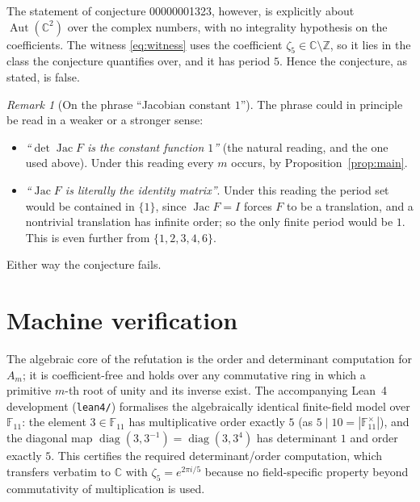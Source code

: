 \documentclass[11pt]{article}
\theoremstyle{remark}
\newtheorem{remark}[theorem]{Remark}
\newcommand{\Aut}{\operatorname{Aut}}
\newcommand{\Jac}{\operatorname{Jac}}
\newcommand{\diag}{\operatorname{diag}}
\newcommand{\C}{\mathbb{C}}
\newcommand{\Z}{\mathbb{Z}}
\newcommand{\F}{\mathbb{F}}
\begin{document}
The statement of conjecture 00000001323, however, is explicitly about
$\Aut(\C^2)$ over the complex numbers, with no integrality hypothesis on the
coefficients. The witness \eqref{eq:witness} uses the coefficient
$\zeta_5\in\C\setminus\Z$, so it lies in the class the conjecture quantifies
over, and it has period $5$. Hence the conjecture, as stated, is false.

\begin{remark}[On the phrase ``Jacobian constant $1$'']
The phrase could in principle be read in a weaker or a stronger sense:
\begin{itemize}
  \item \emph{``$\det\Jac F$ is the constant function $1$''} (the natural
    reading, and the one used above). Under this reading every $m$ occurs, by
    Proposition~\ref{prop:main}.
  \item \emph{``$\Jac F$ is literally the identity matrix''}. Under this
    reading the period set would be contained in $\{1\}$, since
    $\Jac F=I$ forces $F$ to be a translation, and a nontrivial translation has
    infinite order; so the only finite period would be $1$. This is even
    further from $\{1,2,3,4,6\}$.
\end{itemize}
Either way the conjecture fails.
\end{remark}

\section{Machine verification}

The algebraic core of the refutation is the order and determinant computation
for $A_m$; it is coefficient-free and holds over any commutative ring in which a
primitive $m$-th root of unity and its inverse exist. The accompanying Lean~4
development (\texttt{lean4/}) formalises the algebraically identical finite-field
model over $\F_{11}$: the element $3\in\F_{11}$ has multiplicative order exactly
$5$ (as $5\mid 10=|\F_{11}^{\times}|$), and the diagonal map
$\diag(3,3^{-1})=\diag(3,3^4)$ has determinant $1$ and order exactly $5$. This
certifies the required determinant/order computation, which transfers verbatim
to $\C$ with $\zeta_5=e^{2\pi i/5}$ because no field-specific property beyond
commutativity of multiplication is used.
\end{document}
